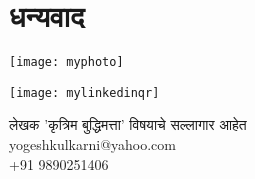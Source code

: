 \chapter*{धन्यवाद }

\begin{minipage}[T]{0.5\textwidth}
    \centering
    \texttt{[image: myphoto]}
\end{minipage}%
\begin{minipage}[T]{0.5\textwidth}
	\centering
    \texttt{[image: mylinkedinqr]}
	
	लेखक 'कृत्रिम बुद्धिमत्ता' विषयाचे सल्लागार आहेत \\
	yogeshkulkarni@yahoo.com \\
	+91 9890251406
\end{minipage}
  

